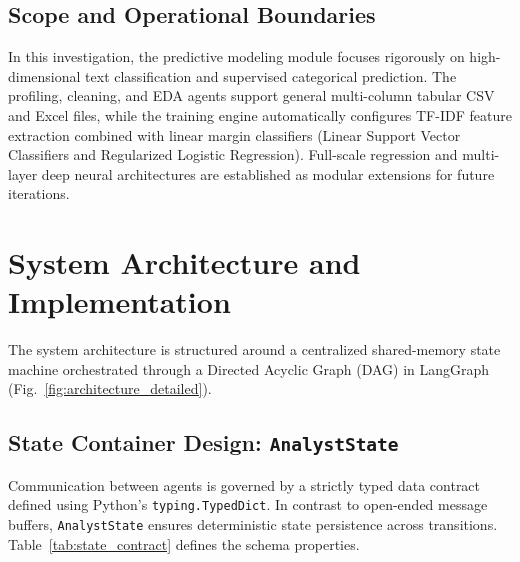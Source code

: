 \documentclass[conference]{IEEEtran}
\begin{document}
\subsection{Scope and Operational Boundaries}
In this investigation, the predictive modeling module focuses rigorously on high-dimensional text classification and supervised categorical prediction. The profiling, cleaning, and EDA agents support general multi-column tabular CSV and Excel files, while the training engine automatically configures TF-IDF feature extraction combined with linear margin classifiers (Linear Support Vector Classifiers and Regularized Logistic Regression). Full-scale regression and multi-layer deep neural architectures are established as modular extensions for future iterations.

\section{System Architecture and Implementation}
The system architecture is structured around a centralized shared-memory state machine orchestrated through a Directed Acyclic Graph (DAG) in LangGraph (Fig.~\ref{fig:architecture_detailed}).

\subsection{State Container Design: \texttt{AnalystState}}
Communication between agents is governed by a strictly typed data contract defined using Python's \texttt{typing.TypedDict}. In contrast to open-ended message buffers, \texttt{AnalystState} ensures deterministic state persistence across transitions. Table~\ref{tab:state_contract} defines the schema properties.
\end{document}
